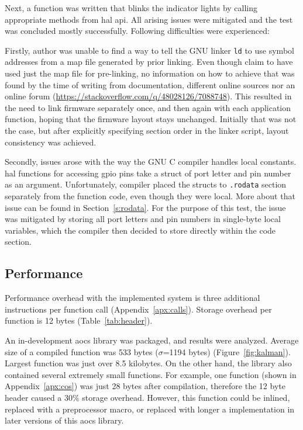 Next, a function was written that blinks the indicator lights by calling appropriate methods from \gls{hal} \gls{api}. All arising issues were mitigated and the test was concluded mostly successfully. Following difficulties were experienced:

Firstly, author was unable to find a way to tell the GNU linker \texttt{ld} to use symbol addresses from a map file generated by prior linking. Even though \textcite{Dunkels2006} claim to have used just the map file for pre-linking, no information on how to achieve that was found by the time of writing from documentation, different online sources nor an online forum (\url{https://stackoverflow.com/q/48028126/7088748}). This resulted in the need to link firmware separately once, and then again with each application function, hoping that the firmware layout stays unchanged. Initially that was not the case, but after explicitly specifying section order in the linker script, layout consistency was achieved.

Secondly, issues arose with the way the GNU C compiler handles local constants. \Gls{hal} functions for accessing \gls{gpio} pins take a struct of port letter and pin number as an argument. Unfortunately, compiler placed the structs to \texttt{.rodata} section separately from the function code, even though they were local. More about that issue can be found in Section~\ref{s:rodata}. For the purpose of this test, the issue was mitigated by storing all port letters and pin numbers in single-byte local variables, which the compiler then decided to store directly within the code section.

\subsection{Performance}

Performance overhead with the implemented system is three additional instructions per function call (Appendix~\ref{apx:calls}). Storage overhead per function is 12 bytes (Table~\ref{tab:header}).

An in-development \gls{aocs} library was packaged, and results were analyzed. Average size of a compiled function was 533 bytes ($\sigma$=1194 bytes) (Figure~\ref{fig:kalman}). Largest function was just over 8.5 kilobytes. On the other hand, the library also contained several extremely small functions. For example, one function (shown in Appendix~\ref{apx:cos}) was just 28 bytes after compilation, therefore the 12 byte header caused a 30\% storage overhead. However, this function could be inlined, replaced with a preprocessor macro, or replaced with longer a implementation in later versions of this \gls{aocs} library.

